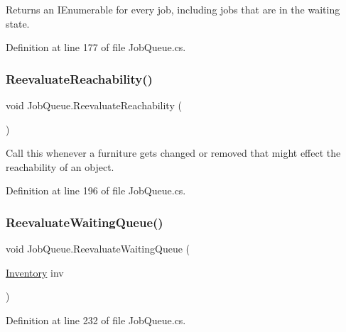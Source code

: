 Returns an I\+Enumerable for every job, including jobs that are in the waiting state. 



Definition at line 177 of file Job\+Queue.\+cs.

\mbox{\label{class_job_queue_ab1c1837e1ad90e8b694cdb9df334bbc3}} 
\subsubsection{\texorpdfstring{Reevaluate\+Reachability()}{ReevaluateReachability()}}
{\footnotesize\ttfamily void Job\+Queue.\+Reevaluate\+Reachability (\begin{DoxyParamCaption}{ }\end{DoxyParamCaption})}



Call this whenever a furniture gets changed or removed that might effect the reachability of an object. 



Definition at line 196 of file Job\+Queue.\+cs.

\mbox{\label{class_job_queue_abc8f1aa2834e93b59016906b35a5281d}} 
\subsubsection{\texorpdfstring{Reevaluate\+Waiting\+Queue()}{ReevaluateWaitingQueue()}}
{\footnotesize\ttfamily void Job\+Queue.\+Reevaluate\+Waiting\+Queue (\begin{DoxyParamCaption}\item[{\hyperlink{class_inventory}{Inventory}}]{inv }\end{DoxyParamCaption})}



Definition at line 232 of file Job\+Queue.\+cs.

\mbox{\label{class_job_queue_aa81b1e92c067b91b41c8a612e9e7985d}} 
